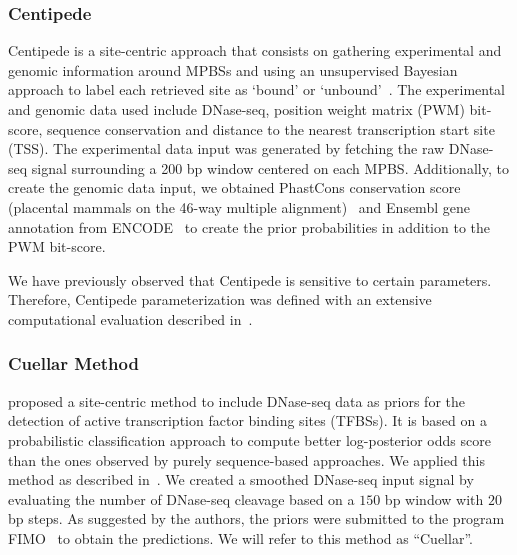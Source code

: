 \documentclass[11pt]{article}
\begin{document}
\subsubsection{Centipede}
\label{sec:centipede}

Centipede is a site-centric approach that consists on gathering experimental and genomic information around MPBSs and using an unsupervised Bayesian approach to label each retrieved site as `bound' or `unbound'~\citep{pique2011}. The experimental and genomic data used include DNase-seq, position weight matrix (PWM) bit-score, sequence conservation and distance to the nearest transcription start site (TSS). The experimental data input was generated by fetching the raw DNase-seq signal surrounding a 200 bp window centered on each MPBS. Additionally, to create the genomic data input, we obtained PhastCons conservation score (placental mammals on the 46-way multiple alignment)~\citep{siepel2005} and Ensembl gene annotation from ENCODE~\citep{hubbard2002} to create the prior probabilities in addition to the PWM bit-score. 

{} We have previously observed that Centipede is sensitive to certain parameters. Therefore, Centipede parameterization was defined with an extensive computational evaluation described in~\cite{gusmao2014}.

\subsubsection{Cuellar Method}
\label{sec:cuellar}

\cite{cuellar2012} proposed a site-centric method to include DNase-seq data as priors for the detection of active transcription factor binding sites (TFBSs). It is based on a probabilistic classification approach to compute better log-posterior odds score than the ones observed by purely sequence-based approaches. We applied this method as described in~\cite{cuellar2012}. We created a smoothed DNase-seq input signal by evaluating the number of DNase-seq cleavage based on a $150$ bp window with $20$ bp steps. {} As suggested by the authors, the priors were submitted to the program FIMO~\citep{grant2011} to obtain the predictions. We will refer to this method as ``Cuellar''.
\end{document}
